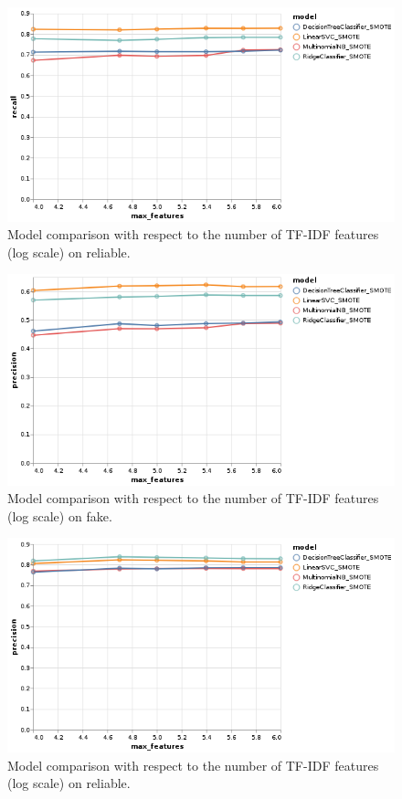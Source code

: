 \documentclass[11pt,a4paper,oneside]{report}
\begin{document}
\begin{figure}[h]
	\centering
	\includegraphics[width=\textwidth]{output/all_reliable_recall_SMOTE.png}
	\caption{Model comparison with respect to the number of TF-IDF features (log scale) on reliable.}
	\label{fig:all_recall_reliable_SMOTE}
\end{figure}

\begin{figure}[h]
	\centering
	\includegraphics[width=\textwidth]{output/all_fake_precision_SMOTE.png}
	\caption{Model comparison with respect to the number of TF-IDF features (log scale) on fake.}
	\label{fig:all_precision_fake_SMOTE}
\end{figure}

\begin{figure}[h]
	\centering
	\includegraphics[width=\textwidth]{output/all_reliable_precision_SMOTE.png}
	\caption{Model comparison with respect to the number of TF-IDF features (log scale) on reliable.}
	\label{fig:all_precision_reliable_SMOTE}
\end{figure}
\end{document}
